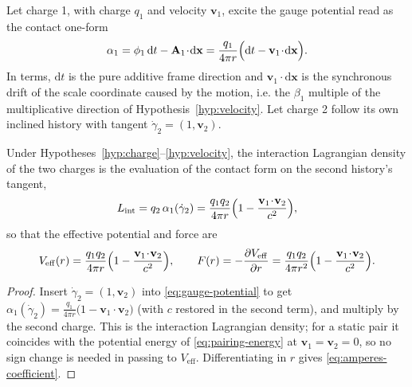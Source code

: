 Let charge 1, with charge $q_1$ and velocity $\mathbf v_1$, excite the gauge
potential read as the contact one-form
\begin{equation}\label{eq:gauge-potential}
  \alpha_1=\phi_1\,\mathrm dt-\mathbf A_1\!\cdot\!\mathrm d\mathbf x
  =\frac{q_1}{4\pi r}\Bigl(\mathrm dt-\mathbf v_1\!\cdot\!\mathrm d\mathbf x\Bigr).
\end{equation}
In \AEG{} terms, $\mathrm dt$ is the pure additive frame direction and
$\mathbf v_1\!\cdot\!\mathrm d\mathbf x$ is the synchronous drift of the scale
coordinate caused by the motion, i.e. the $\beta_1$ multiple of the
multiplicative direction of Hypothesis~\ref{hyp:velocity}.  Let charge 2 follow
its own inclined history with tangent $\dot\gamma_2=(1,\mathbf v_2)$.

\begin{proposition}
\label{prop:ampere}
Under Hypotheses~\ref{hyp:charge}--\ref{hyp:velocity}, the interaction
Lagrangian density of the two charges is the evaluation of the contact form on
the second history's tangent,
\begin{equation}\label{eq:amperes-lagrangian}
  L_{\mathrm{int}}=q_2\,\alpha_1(\dot\gamma_2)
  =\frac{q_1q_2}{4\pi r}\Bigl(1-\frac{\mathbf v_1\!\cdot\!\mathbf v_2}{c^{2}}\Bigr),
\end{equation}
so that the effective potential and force are
\begin{equation}\label{eq:amperes-coefficient}
  V_{\mathrm{eff}}(r)=\frac{q_1q_2}{4\pi r}
   \Bigl(1-\frac{\mathbf v_1\!\cdot\!\mathbf v_2}{c^{2}}\Bigr),
  \qquad
  F(r)=-\frac{\partial V_{\mathrm{eff}}}{\partial r}
  =\frac{q_1q_2}{4\pi r^{2}}
   \Bigl(1-\frac{\mathbf v_1\!\cdot\!\mathbf v_2}{c^{2}}\Bigr).
\end{equation}
\end{proposition}

\begin{proof}
Insert $\dot\gamma_2=(1,\mathbf v_2)$ into \eqref{eq:gauge-potential} to get
$\alpha_1(\dot\gamma_2)=\frac{q_1}{4\pi r}\bigl(1-\mathbf v_1\!\cdot\!\mathbf
v_2\bigr)$ (with $c$ restored in the second term), and multiply by the second
charge.  This is the interaction Lagrangian density; for a static pair it
coincides with the potential energy of \eqref{eq:pairing-energy} at
$\mathbf v_1=\mathbf v_2=0$, so no sign change is needed in passing to
$V_{\mathrm{eff}}$.  Differentiating in $r$ gives
\eqref{eq:amperes-coefficient}.
\end{proof}

